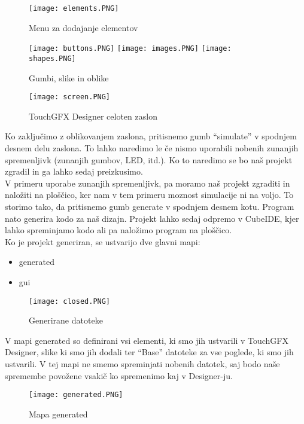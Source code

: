\documentclass{article}
\begin{document}
\begin{figure}[H] %
  \centering
  \texttt{[image: elements.PNG]}
  \caption{Menu za dodajanje elementov}
\end{figure}

\begin{figure}[H] %
  \centering
  \texttt{[image: buttons.PNG]}
  \texttt{[image: images.PNG]}
  \texttt{[image: shapes.PNG]}
  \caption{Gumbi, slike in oblike}
\end{figure}

\begin{figure}[H] %
  \centering
  \texttt{[image: screen.PNG]}
  \caption{TouchGFX Designer celoten zaslon}
\end{figure}

\noindent
Ko zaklju\v{c}imo z oblikovanjem zaslona, pritisnemo gumb ``simulate''
v spodnjem desnem delu zaslona. To lahko naredimo le \v{c}e nismo
uporabili nobenih zunanjih spremenljivk (zunanjih gumbov, LED, itd.).
Ko to naredimo se bo na\v{s} projekt zgradil in ga lahko sedaj
preizkusimo. \\
V primeru uporabe zunanjih spremenljivk, pa
moramo na\v{s} projekt zgraditi in nalo\v{z}iti na plo\v{s}\v{c}ico,
ker nam v tem primeru moznost simulacije ni na voljo. To storimo tako,
da pritisnemo gumb generate v spodnjem desnem kotu.
Program nato generira kodo za na\v{s} dizajn. Projekt lahko sedaj
odpremo v CubeIDE, kjer lahko spreminjamo kodo ali pa nalo\v{z}imo
program na plo\v{s}\v{c}ico. \\

\noindent
Ko je projekt generiran, se ustvarijo dve glavni mapi:
\begin{itemize}
    \item generated
    \item gui
\end{itemize}

\begin{figure}[H] %
  \centering
  \texttt{[image: closed.PNG]}
  \caption{Generirane datoteke}
\end{figure}

\noindent
V mapi generated so definirani vsi elementi, ki smo jih ustvarili
v TouchGFX Designer, slike ki smo jih dodali ter ``Base'' datoteke
za vse poglede, ki smo jih ustvarili. V tej mapi ne smemo spreminjati
nobenih datotek, saj bodo na\v{s}e spremembe povo\v{z}ene vsaki\v{c}
ko spremenimo kaj v Designer-ju. \\
\begin{figure}[H] %
  \centering
  \texttt{[image: generated.PNG]}
  \caption{Mapa generated}
\end{figure}
\end{document}
